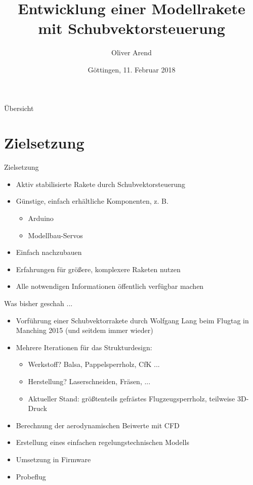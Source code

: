 \documentclass{beamer}
\title[Schubvektorsteuerung]{Entwicklung einer Modellrakete mit Schubvektorsteuerung}
\date[2018--02--11]{Göttingen, 11. Februar 2018}
\author[Oliver Arend, Solaris-RMB e.V.]{Oliver Arend\inst{1}}
\institute[]{
\inst{1}Solaris-RMB e.V.
}
\begin{document}
\frame{\maketitle}

\begin{frame}{Übersicht}
\tableofcontents
\end{frame}

\section{Zielsetzung}

\begin{frame}{Zielsetzung}
\begin{itemize}
\item Aktiv stabilisierte Rakete durch Schubvektorsteuerung
\item Günstige, einfach erhältliche Komponenten, z. B.
\begin{itemize}
\item Arduino
\item Modellbau-Servos
\end{itemize}
\item Einfach nachzubauen
\item Erfahrungen für größere, komplexere Raketen nutzen
\item Alle notwendigen Informationen öffentlich verfügbar machen
\end{itemize}
\end{frame}

\begin{frame}{Was bisher geschah ...}
\begin{itemize}
\item Vorführung einer Schubvektorrakete durch Wolfgang Lang beim Flugtag in Manching 2015 (und seitdem immer wieder)
\item Mehrere Iterationen für das Strukturdesign:
\begin{itemize}
\item Werkstoff? Balsa, Pappelsperrholz, CfK ...
\item Herstellung? Laserschneiden, Fräsen, ...
\item Aktueller Stand: größtenteils gefrästes Flugzeugsperrholz, teilweise 3D-Druck
\end{itemize}
\item Berechnung der aerodynamischen Beiwerte mit CFD
\item Erstellung eines einfachen regelungstechnischen Modells
\item Umsetzung in Firmware
\item Probeflug
\end{itemize}
\end{frame}
\end{document}
